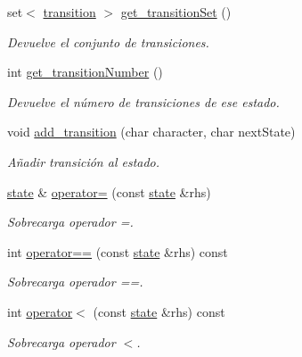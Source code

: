 \begin{DoxyCompactItemize}
\mbox{\label{classstate_a500a0963e1f0d67227083caf46225795}} 
set$<$ \mbox{\hyperlink{classtransition}{transition}} $>$ \mbox{\hyperlink{classstate_a500a0963e1f0d67227083caf46225795}{get\+\_\+transition\+Set}} ()
\begin{DoxyCompactList}\small\item\em Devuelve el conjunto de transiciones. \end{DoxyCompactList}\item 
\mbox{\label{classstate_ac9a2cc746237061c5b524d576f47e9df}} 
int \mbox{\hyperlink{classstate_ac9a2cc746237061c5b524d576f47e9df}{get\+\_\+transition\+Number}} ()
\begin{DoxyCompactList}\small\item\em Devuelve el número de transiciones de ese estado. \end{DoxyCompactList}\item 
\mbox{\label{classstate_ab5407ccf961f8429c9419a24d39a3b58}} 
void \mbox{\hyperlink{classstate_ab5407ccf961f8429c9419a24d39a3b58}{add\+\_\+transition}} (char character, char next\+State)
\begin{DoxyCompactList}\small\item\em Añadir transición al estado. \end{DoxyCompactList}\item 
\mbox{\label{classstate_a84e8155bb10a8acca7295df47b5bd51b}} 
\mbox{\hyperlink{classstate}{state}} \& \mbox{\hyperlink{classstate_a84e8155bb10a8acca7295df47b5bd51b}{operator=}} (const \mbox{\hyperlink{classstate}{state}} \&rhs)
\begin{DoxyCompactList}\small\item\em Sobrecarga operador =. \end{DoxyCompactList}\item 
\mbox{\label{classstate_a11f919a4500e40494d3f24f12e1d0e67}} 
int \mbox{\hyperlink{classstate_a11f919a4500e40494d3f24f12e1d0e67}{operator==}} (const \mbox{\hyperlink{classstate}{state}} \&rhs) const
\begin{DoxyCompactList}\small\item\em Sobrecarga operador ==. \end{DoxyCompactList}\item 
\mbox{\label{classstate_a0f39dd40c21202de8607a230d26dbf90}} 
int \mbox{\hyperlink{classstate_a0f39dd40c21202de8607a230d26dbf90}{operator$<$}} (const \mbox{\hyperlink{classstate}{state}} \&rhs) const
\begin{DoxyCompactList}\small\item\em Sobrecarga operador $<$. \end{DoxyCompactList}\end{DoxyCompactItemize}


